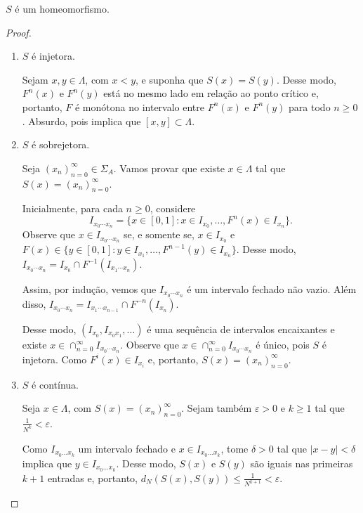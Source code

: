 \begin{proposition}
$S$ é um homeomorfismo.
\end{proposition}


\begin{proof}

\begin{enumerate}

\item $S$ é injetora.

Sejam $x, y \in \Lambda$, com $x < y$, e suponha que $S(x) = S(y)$. Desse modo, $F^n(x)$ e $F^n(y)$ está no mesmo lado em relação ao ponto crítico e, portanto, $F$ é monótona no intervalo entre $F^n(x)$ e $F^n(y)$ para todo $n \geq 0$. Absurdo, pois implica que $[x, y] \subset \Lambda$.

\item $S$ é sobrejetora.

Seja $(x_n)_{n=0}^\infty \in \Sigma_A$. Vamos provar que existe $x \in \Lambda$ tal que $S(x) = (x_n)_{n=0}^\infty$.

Inicialmente, para cada $n \geq 0$, considere
$$I_{x_0 \cdots x_n} = \{ x \in [0,1] : x \in I_{x_0}, \dots, F^n(x) \in I_{x_n} \}.$$
Observe que $x \in I_{x_0 \cdots x_n}$ se, e somente se, $x \in I_{x_0}$ e $F(x) \in \{ y \in [0,1] : y \in I_{x_1}, \dots, F^{n-1}(y) \in I_{x_n} \}$. Desse modo, $I_{x_0 \cdots x_n} = I_{x_0} \cap F^{-1}(I_{x_1 \cdots x_n})$.

Assim, por indução, vemos que $I_{x_0 \cdots x_n}$ é um intervalo fechado não vazio. Além disso, $I_{x_0 \cdots x_n} = I_{x_1 \cdots x_{n-1}} \cap F^{-n}(I_{x_n})$.

Desse modo, $(I_{x_0}, I_{x_0 x_1}, \dots)$ é uma sequência de intervalos encaixantes e existe $x \in \cap_{n=0}^\infty I_{x_0 \cdots x_n}$. Observe que $x \in \cap_{n=0}^\infty I_{x_0 \cdots x_n}$ é único, pois $S$ é injetora. Como $F^i(x) \in I_{x_i}$ e, portanto, $S(x) = (x_n)_{n=0}^\infty$.

\item $S$ é contínua.

Seja $x \in \Lambda$, com $S(x) = (x_n)_{n=0}^\infty$. Sejam também $\varepsilon > 0$ e $k \geq 1$ tal que $\frac{1}{N^k} < \varepsilon$.

Como $I_{x_0 \dots x_k}$ um intervalo fechado e $x \in I_{x_0 \dots x_k}$, tome $\delta > 0$ tal que $|x-y| < \delta$ implica que $y \in I_{x_0 \dots x_k}$. Desse modo, $S(x)$ e $S(y)$ são iguais nas primeiras $k+1$ entradas e, portanto, $d_N(S(x), S(y)) \leq \frac{1}{N^{k+1}} < \varepsilon$.

\end{enumerate}
\end{proof}


